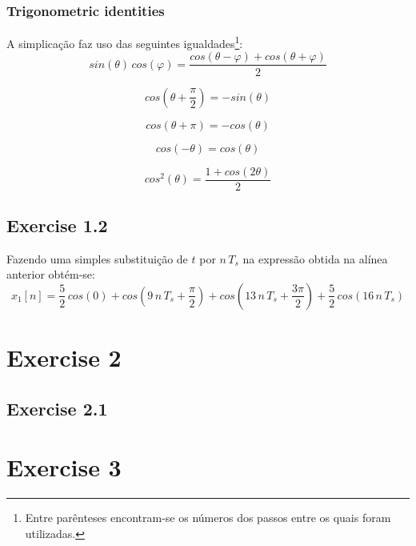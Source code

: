 \documentclass[a4paper]{article}
\begin{document}
\subsubsection{Trigonometric identities}
\label{subsubsec:trigident}
A simplicação faz uso das seguintes igualdades\footnote{Entre parênteses encontram-se os números dos passos entre os quais foram utilizadas.}:
\begin{equation}
sin(\theta) \, cos(\varphi) = \frac{cos(\theta - \varphi) + cos(\theta + \varphi)}{2}
\tag{3 to 4}
\label{eqnarr:trigident}
\end{equation}

\begin{equation}
cos(\theta + \frac{\pi}{2}) = -sin(\theta)
\tag{5 to 6}
\end{equation}

\begin{equation}
cos(\theta + \pi) = -cos(\theta)
\tag{6 to 7}
\end{equation}

\begin{equation}
cos(-\theta) = cos(\theta)
\tag{7 to 8}
\end{equation}

\begin{equation}
cos^2(\theta) = \frac{1 + cos(2 \theta)}{2}
\tag{8 to 9}
\end{equation}

\subsection{Exercise 1.2}
Fazendo uma simples substituição de $t$ por $n \, T_{s}$ na expressão obtida na alínea anterior obtém-se:
\begin{equation}
	x_{1}[n] = \frac{5}{2} \, cos(0) + cos(9 \, n \, T_{s} + \frac{\pi}{2}) + cos(13 \, n \, T_{s} + \frac{3 \pi}{2}) + \frac{5}{2} \, cos(16 \, n \, T_{s})
\end{equation}


\section{Exercise 2}
\subsection{Exercise 2.1}
\indent \indent 



\section{Exercise 3}
\end{document}
